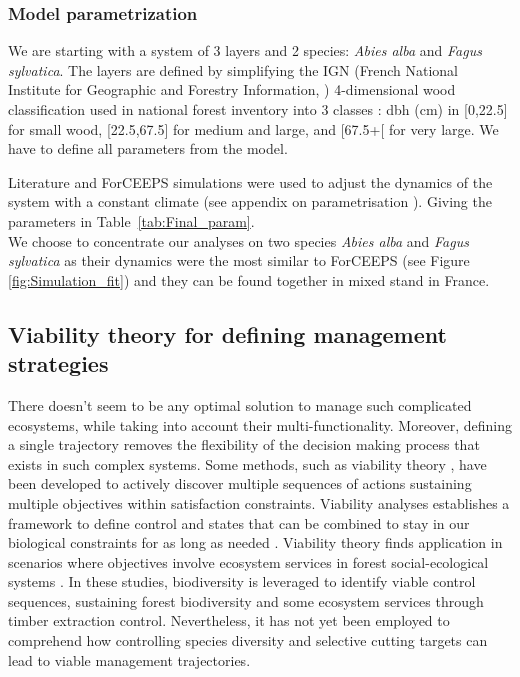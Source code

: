 \documentclass{article}
\begin{document}
\subsubsection{Model parametrization}

We are starting with a system of 3 layers and 2 species: \textit{Abies alba} and \textit{Fagus sylvatica}. The layers are defined by simplifying the IGN (French National Institute for Geographic and Forestry Information, \autocite{CategorieIGN}) 4-dimensional wood classification used in national forest inventory into 3 classes : dbh (cm) in [0,22.5] for small wood, [22.5,67.5] for medium and large, and [67.5+[ for very large. We have to define all parameters from the model.

Literature and ForCEEPS simulations were used to adjust the dynamics of the system with a constant climate (see appendix on parametrisation \autocite{bugmannEcologyMountainousForests1994,morinForestSuccessionGap2021}). Giving the parameters in Table~\ref{tab:Final_param}.\\
We choose to concentrate our analyses on two species \textit{Abies alba} and \textit{Fagus sylvatica} as their dynamics were the most similar to ForCEEPS (see Figure \ref{fig:Simulation_fit}) and they can be found together in mixed stand in France.

\subsection{Viability theory for defining management strategies}

There doesn't seem to be any optimal solution to manage such complicated ecosystems, while taking into account their multi-functionality. Moreover, defining a single trajectory removes the flexibility of the decision making process that exists in such complex systems. Some methods, such as viability theory \autocite{aubinStochasticViabilityInvariance1990}, have been developed to actively discover multiple sequences of actions sustaining multiple objectives within satisfaction constraints. Viability analyses establishes a framework to define control and states that can be combined to stay in our biological constraints for as long as needed \autocite{rougeExtendingViabilityTheory2013}.
Viability theory finds application in scenarios where objectives involve ecosystem services in forest social-ecological systems \autocite{mathiasUsingViabilityTheory2015}. In these studies, biodiversity is leveraged to identify viable control sequences, sustaining forest biodiversity and some ecosystem services through timber extraction control.
Nevertheless, it has not yet been employed to comprehend how controlling species diversity and selective cutting targets can lead to viable management trajectories.
\end{document}
